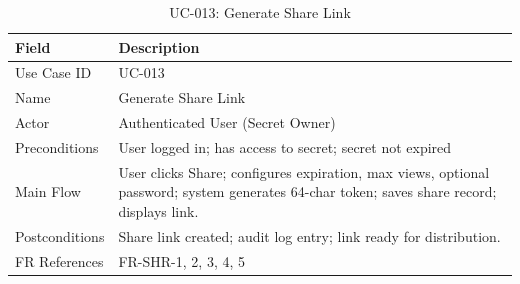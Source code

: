 \documentclass[12pt,a4paper]{article}
\begin{document}
\begin{table}[H]
  \centering
  \small
  \caption{UC-013: Generate Share Link}
  \begin{tabular}{@{}p{2.4cm}>{\raggedright\arraybackslash}p{10.2cm}@{}}
    \toprule
    \textbf{Field} & \textbf{Description}                                                                                                                       \\
    \midrule
    Use Case ID    & UC-013                                                                                                                                     \\
    \hline
    Name           & Generate Share Link                                                                                                                        \\
    \hline
    Actor          & Authenticated User (Secret Owner)                                                                                                          \\
    \hline
    Preconditions  & User logged in; has access to secret; secret not expired                                                                                   \\
    \hline
    Main Flow      & User clicks Share; configures expiration, max views, optional password; system generates 64-char token; saves share record; displays link. \\
    \hline
    Postconditions & Share link created; audit log entry; link ready for distribution.                                                                          \\
    \hline
    FR References  & FR-SHR-1, 2, 3, 4, 5                                                                                                                       \\
    \bottomrule
  \end{tabular}
\end{table}
\end{document}
